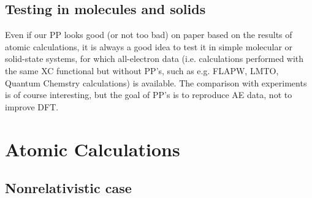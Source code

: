 \documentclass[12pt,a4paper]{article}
\begin{document}
\subsection{Testing in molecules and solids}

Even if our PP looks good
(or not too bad) on paper based on the results of atomic calculations,
it is always a good idea to test it in simple molecular or solid-state
systems, for which all-electron data (i.e. calculations performed with
the same XC functional but without PP's, such as e.g. FLAPW, LMTO,
Quantum Chemstry calculations) is available. The comparison with
experiments is of course interesting, but the goal of PP's is to 
reproduce AE data, not to improve DFT.


\appendix

\section{Atomic Calculations}

\subsection{Nonrelativistic case}
\end{document}

